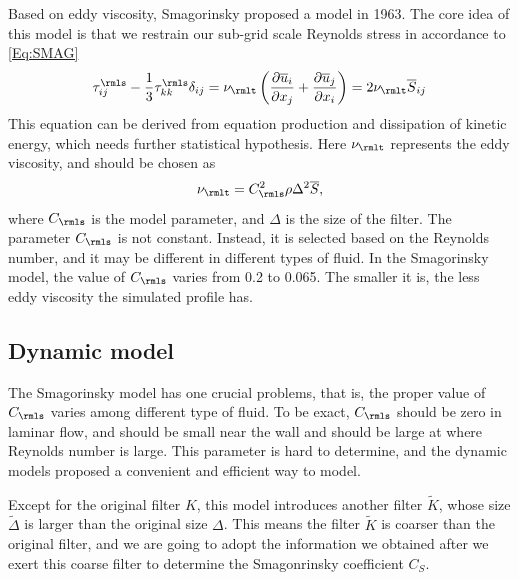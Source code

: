 \documentclass[english, nochinese]{pkupaper}
\begin{document}
Based on eddy viscosity, Smagorinsky proposed a model in 1963. The core idea of this model is that we restrain our sub-grid scale Reynolds stress in accordance to \eqref{Eq:SMAG}
\begin{equation}\label{Eq:SMAG}
\tau^{\rmls}_{ij} - \frac{1}{3}\tau^{\rmls}_{kk}\delta_{ij} = \nu_{\rmlt} \left(\frac{\partial\overline{u}_i}{\partial x_j} + \frac{\partial\overline{u}_j}{\partial x_i}\right) = 2\nu_{\rmlt}\overline{S}_{ij}
\end{equation}
This equation can be derived from equation production and dissipation of kinetic energy, which needs further statistical hypothesis. Here $\nu_{\rmlt}$ represents the eddy viscosity, and should be chosen as
\begin{equation}\label{Eq:MuT}
\nu_{\rmlt} = C_{\rmls}^2\rho\Delta^2\overline{S},
\end{equation}
where $C_{\rmls}$ is the model parameter, and $\Delta$ is the size of the filter. 
The parameter $C_{\rmls}$ is not constant. Instead, it is selected based on the Reynolds number, and it may be different in different types of fluid. In the Smagorinsky model, the value of $C_{\rmls}$ varies from 0.2 to 0.065. The smaller it is, the less eddy viscosity the simulated profile has.

\subsection{Dynamic model}

The Smagorinsky model has one crucial problems, that is, the proper value of $C_{\rmls}$ varies among different type of fluid. To be exact, $C_{\rmls}$ should be zero in laminar flow, and should be small near the wall and should be large at where Reynolds number is large. This parameter is hard to determine, and the dynamic models proposed a convenient and efficient way to model.

Except for the original filter $K$, this model introduces another filter $\widetilde{K}$, whose size $\widetilde{\Delta}$ is larger than the original size $\Delta$. This means the filter $\widetilde{K}$ is coarser than the original filter, and we are going to adopt the information we obtained after we exert this coarse filter to determine the Smagonrinsky coefficient $C_S$.
\end{document}
